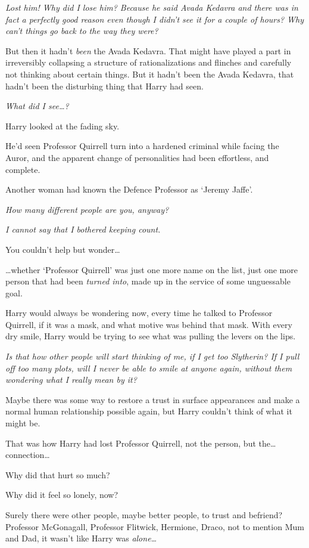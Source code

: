 \emph{Lost him! Why did I lose him? Because he said Avada Kedavra and there was
in fact a perfectly good reason even though I didn't see it for a couple of
hours? Why can't things go back to the way they were?}

But then it hadn't \emph{been} the Avada Kedavra. That might have played a part
in irreversibly collapsing a structure of rationalizations and flinches and
carefully not thinking about certain things. But it hadn't been the Avada
Kedavra, that hadn't been the disturbing thing that Harry had seen.

\emph{What did I see…?}

Harry looked at the fading sky.

He'd seen Professor Quirrell turn into a hardened criminal while facing the
Auror, and the apparent change of personalities had been effortless, and
complete.

Another woman had known the Defence Professor as `Jeremy Jaffe'.

\emph{How many different people are you, anyway?}

\emph{I cannot say that I bothered keeping count.}

You couldn't help but wonder…

…whether `Professor Quirrell' was just one more name on the list, just
one more person that had been \emph{turned into}, made up in the service of
some unguessable goal.

Harry would always be wondering now, every time he talked to Professor
Quirrell, if it was a mask, and what motive was behind that mask. With every
dry smile, Harry would be trying to see what was pulling the levers on the lips.

\emph{Is that how other people will start thinking of me, if I get too
Slytherin? If I pull off too many plots, will I never be able to smile at
anyone again, without them wondering what I really mean by it?}

Maybe there was some way to restore a trust in surface appearances and make a
normal human relationship possible again, but Harry couldn't think of what it
might be.

That was how Harry had lost Professor Quirrell, not the person, but
the…connection…

Why did that hurt so much?

Why did it feel so lonely, now?

Surely there were other people, maybe better people, to trust and befriend?
Professor McGonagall, Professor Flitwick, Hermione, Draco, not to mention Mum
and Dad, it wasn't like Harry was \emph{alone…}

